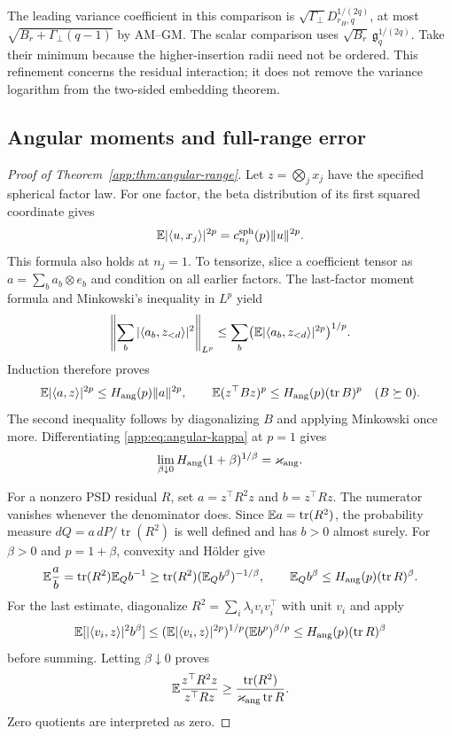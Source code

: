 \documentclass[11pt,a4paper]{article}
\theoremstyle{definition}\newtheorem{definition}[theorem]{Definition}
\theoremstyle{remark}\newtheorem{remark}[theorem]{Remark}
\numberwithin{equation}{section}
\newcommand{\gmom}{\mathfrak g}
\newcommand{\norm}[1]{\lVert#1\rVert}\newcommand{\ip}[2]{\langle#1,#2\rangle}
\DeclareMathOperator{\tr}{tr}\DeclareMathOperator{\rank}{rank}
\begin{document}
The leading variance coefficient in this comparison is
$\sqrt{\Gamma_{\perp}} D_{r_H,q}^{1/(2q)}$, at most
$\sqrt{B_r+\Gamma_{\perp}(q-1)}$ by AM--GM. The scalar comparison uses
$\sqrt{B_r}\,\gmom_q^{1/(2q)}$.
Take their minimum because the higher-insertion radii need not be
ordered. This refinement concerns the residual interaction; it
does not remove the variance logarithm from the two-sided embedding
theorem.

\subsection{Angular moments and full-range error}\label{appendix:angular}
\begin{proof}[Proof of Theorem~\ref{app:thm:angular-range}]
Let $z=\bigotimes_j x_j$ have the specified spherical factor law.
For one factor, the beta distribution of its first squared coordinate
gives
\[
 \E|\ip u{x_j}|^{2p}=c_{n_j}^{\rm sph}(p)\norm u^{2p}.
\]
This formula also holds at $n_j=1$. To tensorize, slice a coefficient
tensor as $a=\sum_b a_b\otimes e_b$ and condition on all earlier
factors. The last-factor moment formula and Minkowski's inequality in
$L^p$ yield
\[
 \left\|\sum_b|\ip{a_b}{z_{<d}}|^2\right\|_{L^p}
 \le\sum_b\bigl(\E|\ip{a_b}{z_{<d}}|^{2p}\bigr)^{1/p}.
\]
Induction therefore proves
\[
 \E|\ip a z|^{2p}\le H_{\rm ang}(p)\norm a^{2p},
 \qquad
 \E(z^\top Bz)^p\le H_{\rm ang}(p)(\tr B)^p
 \quad(B\succeq0).
\]
The second inequality follows by diagonalizing $B$ and applying
Minkowski once more. Differentiating \eqref{app:eq:angular-kappa}
at $p=1$ gives
\begin{equation}\label{app:eq:angular-limit}
 \lim_{\beta\downarrow0}
 H_{\rm ang}(1+\beta)^{1/\beta}=\varkappa_{\rm ang}.
\end{equation}

For a nonzero PSD residual $R$, set $a=z^\top R^2z$ and $b=z^\top Rz$.
The numerator vanishes whenever the denominator does.
Since $\E a=\tr(R^2)$, the probability measure
$dQ=a\,dP/\tr(R^2)$ is well defined and has $b>0$ almost surely.
For $\beta>0$ and $p=1+\beta$, convexity and H\"older give
\[
 \E\frac ab
 =\tr(R^2)\E_Qb^{-1}
 \ge\tr(R^2)(\E_Qb^\beta)^{-1/\beta},
 \qquad
 \E_Qb^\beta\le H_{\rm ang}(p)(\tr R)^\beta.
\]
For the last estimate, diagonalize $R^2=\sum_i\lambda_i v_iv_i^\top$
with unit $v_i$ and apply
\[
 \E[|\ip{v_i}z|^2b^\beta]
 \le(\E|\ip{v_i}z|^{2p})^{1/p}
       (\E b^p)^{\beta/p}
 \le H_{\rm ang}(p)(\tr R)^\beta
\]
before summing. Letting $\beta\downarrow0$ proves
\begin{equation}\label{app:eq:angular-drift}
 \E\frac{z^\top R^2z}{z^\top Rz}
 \ge\frac{\tr(R^2)}{\varkappa_{\rm ang}\tr R}.
\end{equation}
Zero quotients are interpreted as zero.


\end{proof}
\end{document}
